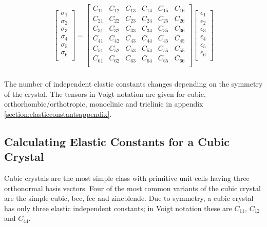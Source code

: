 \begin{equation}
  \begin{split}
    \begin{bmatrix}
      \sigma_{1} \\
      \sigma_{2} \\
      \sigma_{3} \\
      \sigma_{4} \\
      \sigma_{5} \\
      \sigma_{6} \\
      \end{bmatrix} = \begin{bmatrix}
      C_{11} & C_{12} & C_{13} & C_{14} & C_{15} & C_{16} \\
      C_{21} & C_{22} & C_{23} & C_{24} & C_{25} & C_{26} \\
      C_{31} & C_{32} & C_{33} & C_{34} & C_{35} & C_{36} \\
      C_{41} & C_{42} & C_{43} & C_{44} & C_{45} & C_{45} \\
      C_{51} & C_{52} & C_{53} & C_{54} & C_{55} & C_{55} \\
      C_{61} & C_{62} & C_{63} & C_{64} & C_{65} & C_{66} \\
      \end{bmatrix} \begin{bmatrix}
      \epsilon_{1} \\
      \epsilon_{2} \\
      \epsilon_{3} \\
      \epsilon_{4} \\
      \epsilon_{5} \\
      \epsilon_{6} \\
      \end{bmatrix}\\
    \end{split}
    \label{eq:eqOrthoRhombicEC}
\end{equation}

The number of independent elastic constants changes depending on the symmetry of the crystal.  The tensors in Voigt notation are given for cubic, orthorhombic/orthotropic, monoclinic and triclinic in appendix \ref{section:elasticconstantsappendix}.


\subsection{Calculating Elastic Constants for a Cubic Crystal}


Cubic crystals are the most simple class with primitive unit cells having three orthonormal basis vectors.  Four of the most common variants of the cubic crystal are the simple cubic, \acrlong{bcc}, \acrlong{fcc} and zincblende.  Due to symmetry, a cubic crystal has only three elastic independent constants; in Voigt notation these are $C_{11}$, $C_{12}$ and $C_{44}$.


